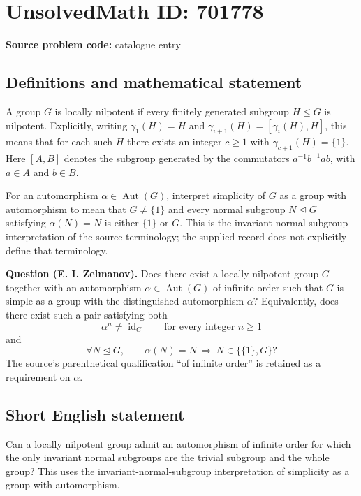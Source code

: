 \documentclass[11pt]{article}
\begin{document}
\section*{UnsolvedMath ID: 701778}
\textbf{Source problem code:} catalogue entry
\subsection{Definitions and mathematical statement}
A group \(G\) is locally nilpotent if every finitely generated subgroup \(H\leq G\) is nilpotent. Explicitly, writing \(\gamma_1(H)=H\) and \(\gamma_{i+1}(H)=[\gamma_i(H),H]\), this means that for each such \(H\) there exists an integer \(c\geq 1\) with \(\gamma_{c+1}(H)=\{1\}\). Here \([A,B]\) denotes the subgroup generated by the commutators \(a^{-1}b^{-1}ab\), with \(a\in A\) and \(b\in B\).

For an automorphism \(\alpha\in\operatorname{Aut}(G)\), interpret simplicity of \(G\) as a group with automorphism to mean that \(G\neq\{1\}\) and every normal subgroup \(N\trianglelefteq G\) satisfying \(\alpha(N)=N\) is either \(\{1\}\) or \(G\). This is the invariant-normal-subgroup interpretation of the source terminology; the supplied record does not explicitly define that terminology.

\textbf{Question (E. I. Zelmanov).} Does there exist a locally nilpotent group \(G\) together with an automorphism \(\alpha\in\operatorname{Aut}(G)\) of infinite order such that \(G\) is simple as a group with the distinguished automorphism \(\alpha\)? Equivalently, does there exist such a pair satisfying both
\[
\alpha^n\neq\operatorname{id}_G\qquad\text{for every integer }n\geq 1
\]
and
\[
\forall N\trianglelefteq G,\qquad
\alpha(N)=N\ \Longrightarrow\ N\in\bigl\{\{1\},G\bigr\}?
\]
The source's parenthetical qualification ``of infinite order'' is retained as a requirement on \(\alpha\).
\subsection{Short English statement}
Can a locally nilpotent group admit an automorphism of infinite order for which the only invariant normal subgroups are the trivial subgroup and the whole group? This uses the invariant-normal-subgroup interpretation of simplicity as a group with automorphism.
\end{document}
